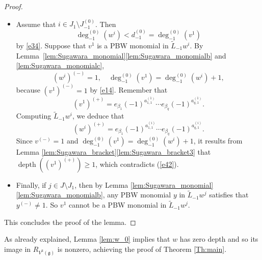 \documentclass[JEP,XML,SOM,Unicode]{cedram}
\let\be\beta
\DeclareMathOperator{\dep}{depth}
\newcommand \g{\mathfrak g}
\theoremstyle{definition}
\begin{document}
\begin{proof}
\begin{itemize}
\item
Assume that $i\in J_1\setminus J_{-1}^{(0)}$.
Then
\begin{equation}
\label{eq:d01}
\deg_{-1}^{(0)} (w^{i})< d_{-1}^{(0)} =\deg_{-1}^{(0)}(v^1)
\end{equation}
by \eqref{e34}.
Suppose that $v^1$ is a PBW monomial in ${\tilde{L}_{-1} w^{i}}$.
By Lemma~\ref{lem:Sugawara_monomial}\eqref{lem:Sugawara_monomialb} and \eqref{lem:Sugawara_monomialc},%
\begin{equation}\label{e16}
(w^{i})^{(-)}=1, \quad \deg_{-1}^{(0)}(v^1)=\deg_{-1}^{(0)}(w^i)+1,
\end{equation}
because $(v^1)^{(-)}=1$ by \eqref{e14}.
Remember that
\begin{equation}\label{e42}
(v^1)^{(+)}=e_{\be_1}(-1)^{a^{(1)}_{1,1}}\cdots e_{\be_{q}}(-1)^{a^{(1)}_{q,1}}.
\end{equation}
Computing $\tilde{L}_{-1} w^{i}$, we deduce that
\[
(w^{i})^{(+)}=e_{\be_1}(-1)^{a^{(i)}_{1,1}}\cdots e_{\be_{q}}(-1)^{a^{(i)}_{q,1}}.
\]
{Since $v^{(-)}=1$ and $\deg_{-1}^{(0)}(v^1)=\deg_{-1}^{(0)}(w^i)+1$,
it results from Lemma \ref{lem:Sugawara_bracket}\eqref{lem:Sugawara_bracket3} that $\dep((v^1)^{(+)})\geq 1$,
which contradicts (\ref{e42})}.

\item
Finally, if $j \in J \setminus J_1$, then by Lemma \ref{lem:Sugawara_monomial}\eqref{lem:Sugawara_monomialb}, any PBW monomial $y$ in $\tilde{L}_{-1}w^j$ satisfies that $y^{(-)}\neq 1$. So $v^1$
cannot be a PBW monomial in $\tilde{L}_{-1}w^j$.
\end{itemize}
This concludes the proof of the lemma.
\end{proof}

As already explained, Lemma \ref{lem:w_0} implies that $w$ has zero depth
and so its image in $R_{V^k(\g)}$ is nonzero,
achieving the proof of Theorem \ref{Th:main}.
\end{document}
